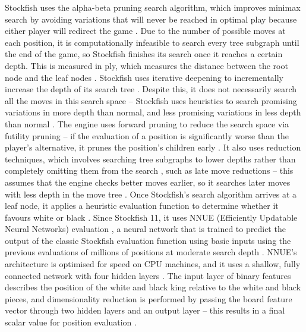 \documentclass[%
 superscriptaddress,
showpacs,preprintnumbers,
 amsmath,
 amssymb,
 aps,
 pra,
showkeys,
onecolumn,
notitlepage,
11pt,
tightenlines      %
]{revtex4-1}
\begin{document}
Stockfish uses the alpha-beta pruning search algorithm, which improves minimax search \cite{v1928theorie} by avoiding variations that will never be reached in optimal play because either player will redirect the game \cite{maharaj2022chess}. Due to the number of possible moves at each position, it is computationally infeasible to search every tree subgraph until the end of the game, so Stockfish finishes its search once it reaches a certain depth. This is measured in ply, which measures the distance between the root node and the leaf nodes \cite{maharaj2022chess}. Stockfish uses iterative deepening to incrementally increase the depth of its search tree \cite{de2014thought}. Despite this, it does not necessarily search all the moves in this search space -- Stockfish uses heuristics to search promising variations in more depth than normal, and less promising variations in less depth than normal \cite{maharaj2022chess}. The engine uses forward pruning to reduce the search space via futility pruning -- if the evaluation of a position is significantly worse than the player's alternative, it prunes the position's children early \cite{maharaj2022chess}. It also uses reduction techniques, which involves searching tree subgraphs to lower depths rather than completely omitting them from the search \cite{maharaj2022chess}, such as late move reductions -- this assumes that the engine checks better moves earlier, so it searches later moves with less depth in the move tree \cite{levy1989sex}. Once Stockfish's search algorithm arrives at a leaf node, it applies a heuristic evaluation function to determine whether it favours white or black \cite{maharaj2022chess}. Since Stockfish 11, it uses NNUE (Efficiently Updatable Neural Networks) evaluation \cite{nasu2018efficiently}, a neural network that is trained to predict the output of the classic Stockfish evaluation function using basic inputs using the previous evaluations of millions of positions at moderate search depth \cite{stockfishNNUEEvaluation}. NNUE's architecture is optimised for speed on CPU machines, and it uses a shallow, fully connected network with four hidden layers \cite{guideToStockfishNNUE}. The input layer of binary features describes the position of the white and black king relative to the white and black pieces, and dimensionality reduction is performed by passing the board feature vector through two hidden layers and an output layer -- this results in a final scalar value for position evaluation \cite{maharaj2022chess}.
\end{document}
